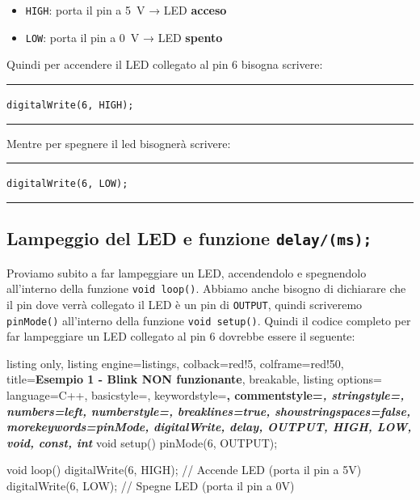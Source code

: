 \begin{itemize}
    \item \texttt{HIGH}: porta il pin a \SI{5}{\volt} → LED \textbf{acceso}
    \item \texttt{LOW}: porta il pin a \SI{0}{\volt} → LED \textbf{spento}
\end{itemize}

Quindi per accendere il LED collegato al pin 6 bisogna scrivere:
\begin{center}
    \hrule
    \vspace{0.2cm}
    \texttt{digitalWrite(6, HIGH);}
    \vspace{0.2cm}
    \hrule
\end{center}

Mentre per spegnere il led bisognerà scrivere:

\begin{center}
    \hrule
    \vspace{0.2cm}
    \texttt{digitalWrite(6, LOW);}
    \vspace{0.2cm}
    \hrule
\end{center}



\subsection{Lampeggio del LED e funzione \texttt{delay/(ms);}}

Proviamo subito a far lampeggiare un LED, accendendolo e spegnendolo all'interno della funzione \texttt{void loop()}. Abbiamo anche bisogno di dichiarare che il pin dove verrà collegato il LED è un pin di \texttt{OUTPUT}, quindi scriveremo \texttt{pinMode()} all'interno della funzione \texttt{void setup()}.
Quindi il codice completo per far lampeggiare un LED collegato al pin 6 dovrebbe essere il seguente:

\begin{tcblisting}{
    listing only,
    listing engine=listings,
    colback=red!5,
    colframe=red!50,
    title=\textbf{Esempio 1 - Blink NON funzionante},
    breakable,
    listing options={
        language=C++,
        basicstyle=\ttfamily\small,
        keywordstyle=\color{blue!80!black}\bfseries,
        commentstyle=\color{green!50!black}\itshape,
        stringstyle=\color{orange!80!black},
        numbers=left,
        numberstyle=\tiny\color{gray},
        breaklines=true,
        showstringspaces=false,
        morekeywords={pinMode, digitalWrite, delay, OUTPUT, HIGH, LOW, void, const, int}
    }
}
void setup() {
    pinMode(6, OUTPUT);
}

void loop() {
    digitalWrite(6, HIGH);  // Accende LED (porta il pin a 5V)
    digitalWrite(6, LOW);   // Spegne LED (porta il pin a 0V)
}
\end{tcblisting}

